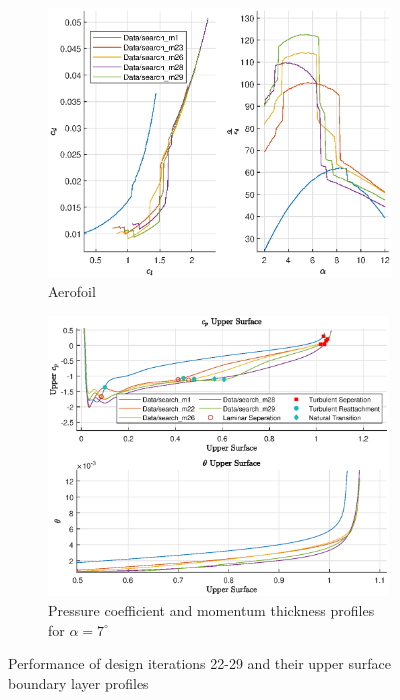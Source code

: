 \documentclass{article}
\begin{document}
\begin{figure}[H]
    \centering
    \begin{subfigure}{0.45\textwidth}
        \centering
        \includegraphics[width=1.2\textwidth, center]{figures/loRe_lod_29.eps}
        \caption{Aerofoil}
        \label{fig:m29_lod}
    \end{subfigure}
    \begin{subfigure}{0.54\textwidth}
        \centering
        \includegraphics[width=0.99\textwidth]{figures/loRe_upperprofile_29_a5.eps}
        \caption{Pressure coefficient and momentum thickness profiles for $\alpha = 7^\circ$}
        \label{fig:m29_uprofile}
    \end{subfigure}
    \caption{Performance of design iterations 22-29 and their upper surface boundary layer profiles}
\end{figure}
\end{document}
